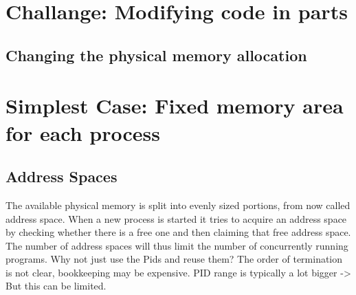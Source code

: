 
\section{Challange: Modifying code in parts}
\subsection*{Changing the physical memory allocation}

\section{Simplest Case: Fixed memory area for each process}
\subsection{Address Spaces}
The available physical memory is split into evenly sized portions, from now called address space.
When a new process is started it tries to acquire an address space by checking whether
there is a free one and then claiming that free address space.
The number of address spaces will thus limit the number of concurrently running programs.
Why not just use the Pids and reuse them? The order of termination is not clear, bookkeeping
may be expensive. PID range is typically a lot bigger -> But this can be limited.
